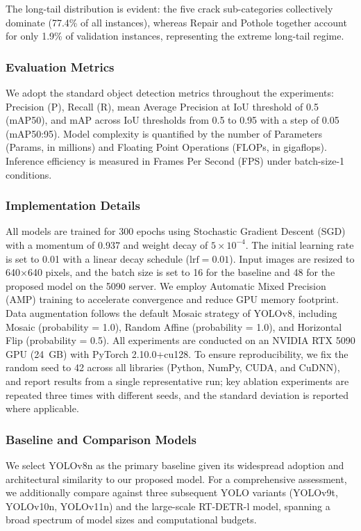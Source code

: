 The long-tail distribution is evident: the five crack sub-categories collectively dominate (77.4\% of all instances), whereas Repair and Pothole together account for only 1.9\% of validation instances, representing the extreme long-tail regime.

\subsubsection{Evaluation Metrics}
We adopt the standard object detection metrics throughout the experiments: Precision (P), Recall (R), mean Average Precision at IoU threshold of 0.5 (mAP50), and mAP across IoU thresholds from 0.5 to 0.95 with a step of 0.05 (mAP50:95). Model complexity is quantified by the number of Parameters (Params, in millions) and Floating Point Operations (FLOPs, in gigaflops). Inference efficiency is measured in Frames Per Second (FPS) under batch-size-1 conditions.

\subsubsection{Implementation Details}
All models are trained for 300 epochs using Stochastic Gradient Descent (SGD) with a momentum of 0.937 and weight decay of $5 \times 10^{-4}$. The initial learning rate is set to 0.01 with a linear decay schedule ($\text{lrf} = 0.01$). Input images are resized to 640$\times$640 pixels, and the batch size is set to 16 for the baseline and 48 for the proposed model on the 5090 server. We employ Automatic Mixed Precision (AMP) training to accelerate convergence and reduce GPU memory footprint. Data augmentation follows the default Mosaic strategy of YOLOv8, including Mosaic (probability = 1.0), Random Affine (probability = 1.0), and Horizontal Flip (probability = 0.5). All experiments are conducted on an NVIDIA RTX 5090 GPU (24~GB) with PyTorch 2.10.0+cu128. To ensure reproducibility, we fix the random seed to 42 across all libraries (Python, NumPy, CUDA, and CuDNN), and report results from a single representative run; key ablation experiments are repeated three times with different seeds, and the standard deviation is reported where applicable.

\subsubsection{Baseline and Comparison Models}
We select YOLOv8n as the primary baseline given its widespread adoption and architectural similarity to our proposed model. For a comprehensive assessment, we additionally compare against three subsequent YOLO variants (YOLOv9t, YOLOv10n, YOLOv11n) and the large-scale RT-DETR-l model, spanning a broad spectrum of model sizes and computational budgets.

